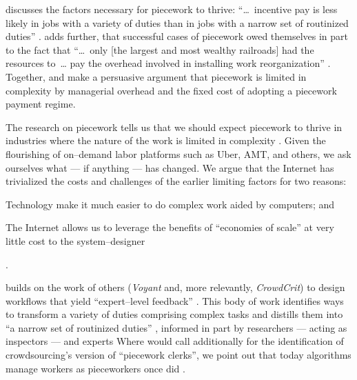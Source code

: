 \documentclass[trackingWork]{subfiles}
\begin{document}
\citeauthor{Brown01041990} discusses the factors necessary for piecework to thrive:
    ``\dots~incentive pay is less likely in jobs with
    a variety of duties than in jobs with a narrow set of routinized duties''
\cite{Brown01041990}.
\citeauthor{10.2307/23702539} adds further, that
successful cases of piecework owed themselves in part to the fact that
    ``\dots~only [the largest and most wealthy railroads] had the resources to~\dots
    pay the overhead involved in installing work reorganization''
\cite{10.2307/23702539}.
Together, \citeauthor{10.2307/23702539} and \citeauthor{Brown01041990}
make a persuasive argument that piecework is limited in complexity by
managerial overhead and the fixed cost of adopting a piecework payment regime.


\subsubsubsection{\whatchanged}
The research on piecework tells us that
we should expect piecework to thrive in industries where
the nature of the work is limited in complexity
\cite{Brown01041990}.
Given the flourishing of on--demand labor platforms such as
Uber, AMT, and others, we ask ourselves
what --- if anything --- has changed.
We argue that
the Internet has trivialized
the costs and challenges of the earlier limiting factors for two reasons:
\begin{inlinelist}
  \item Technology make it much easier to do complex work aided by computers; and %
  \item The Internet allows us to leverage the benefits of
        ``economies of scale'' at very little cost
        to the system--designer \cite{lessig2006code,miller2011understanding}
\end{inlinelist}.

\citeauthor{yuanAlmost} builds on the work of others
(\textit{Voyant} and, more relevantly, \textit{CrowdCrit})
to design workflows that yield ``expert--level feedback''
\cite{yuanAlmost,Xu:2014:VGS:2531602.2531604,Luther:2014:CCA:2556420.2556788}.
This body of work identifies ways to transform a variety of duties comprising complex tasks
and distills them into ``a narrow set of routinized duties''%
, informed in part by researchers --- acting as inspectors --- and experts
\cite[quotations from][]{10.2307/23702539}
Where \citeauthor{10.2307/23702539} would call additionally for the identification of
crowdsourcing's version of ``piecework clerks'', we point out that
today algorithms manage workers as pieceworkers once did
\cite{uberAlgorithm,10.2307/23702539}.
\end{document}
